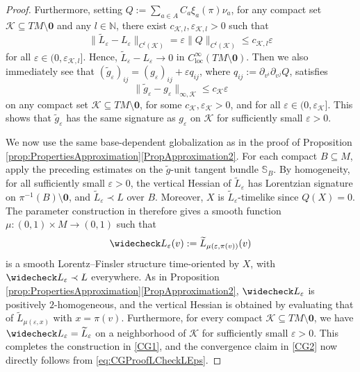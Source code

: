 \documentclass[a4paper,11pt]{article}
\numberwithin{equation}{section}
\theoremstyle{definition}
\theoremstyle{plain}
\newcommand{\N}{\mathbb N}
\newcommand{\eps}{\varepsilon}
\newcommand{\loc}{\mathrm{loc}}
\begin{document}
\begin{proof}
Furthermore, setting $Q:=\sum_{a \in A} C_a\xi_a(\pi) \nu_{a}$, for any compact set $\mathcal{K} \subseteq TM \setminus \mathbf{0}$ and any $l \in \N$, there exist $c_{\mathcal{K},l},\eps_{\mathcal{K},l}>0$ such that 
\begin{equation} \label{eq:CGProofLCheckLEps}
    \| \widetilde{L}_\eps - L_\eps\|_{C^l(\mathcal{K})} =  \eps \| Q\|_{C^l(\mathcal{K})} \leq c_{\mathcal{K},l} \eps
\end{equation}
for all $\eps \in (0,\eps_{\mathcal{K},l}]$.
Hence, $\widetilde{L}_\eps - L_\eps \rightarrow 0$ in $C^{\infty}_{\loc}(TM \setminus \mathbf{0})$.
Then we also immediately see that $(\tilde g_\varepsilon)_{ij} = (g_\eps)_{ij} + \eps q_{ij}$, where $q_{ij}:=\partial_{v^i}\partial_{v^j} Q$, satisfies
\begin{equation} \label{eq:CGProofMetrics}
    \| \tilde g_\eps - g_\eps \|_{\infty, \mathcal{K}} \leq c_{\mathcal{K}} \eps
\end{equation}
on any compact set $\mathcal{K} \subseteq TM \setminus \mathbf{0}$, for some $c_{\mathcal K},\eps_{\mathcal K}>0$, and for all $\eps \in (0,\eps_{\mathcal K}]$.
This shows that $\tilde{g}_\eps$ has the same signature as $g_\eps$ on $\mathcal{K}$ for sufficiently small $\eps>0$.

We now use the same base-dependent globalization as in the proof of Proposition \ref{prop:PropertiesApproximation}\ref{PropApproximation2}.
For each compact $B \subseteq M$, apply the preceding estimates on the $\tilde g$-unit tangent bundle $\mathbb{S}_B$. 
By homogeneity, for all sufficiently small $\varepsilon>0$, the vertical Hessian of $\widetilde L_\varepsilon$ has Lorentzian signature on $\pi^{-1}(B)\setminus \mathbf 0$, and $\widetilde L_\varepsilon \prec L$ over $B$. 
Moreover, $X$ is $\widetilde{L}_\eps$-timelike since $Q(X)=0$. The parameter construction in \cite[Lem.\ 4.3]{HoermannKunzingerSteinbauer-WaveEq}
therefore gives a smooth function $\mu:(0,1) \times M \to (0,1)$ such that
\[
    \widecheck L_\varepsilon(v)
    := \widetilde L_{\mu(\varepsilon,\pi(v))}(v)
\]
is a smooth Lorentz--Finsler structure time-oriented by $X$, with $\widecheck L_\varepsilon \prec L$ everywhere. 
As in Proposition \ref{prop:PropertiesApproximation}\ref{PropApproximation2}, $\widecheck L_\varepsilon$ is positively $2$-homogeneous, and the vertical Hessian is obtained by evaluating that of $\widetilde L_{\mu(\eps,x)}$ with $x=\pi(v)$.
Furthermore, for every compact $\mathcal K \subseteq TM\setminus \mathbf 0$, we have $\widecheck L_\varepsilon=\widetilde L_\varepsilon$ on a
neighborhood of $\mathcal K$ for sufficiently small $\varepsilon >0$.
This completes the construction in \ref{CG1}, and the convergence claim in \ref{CG2} now directly follows from \eqref{eq:CGProofLCheckLEps}.


\end{proof}
\end{document}

